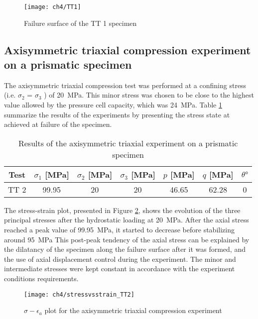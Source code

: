 \begin{figure}[tb]
    \centering
    \texttt{[image: ch4/TT1]}
    \caption{Failure surface of the TT 1 specimen}
    \label{fig4:12}
\end{figure} 

\subsection{Axisymmetric triaxial compression experiment on a prismatic specimen}

The axisymmetric triaxial compression test was performed at a confining stress (i.e. $\sigma_2$ = $\sigma_3$ ) of \SI{20}{MPa}. This minor stress was chosen to be close to the highest value allowed by the pressure cell capacity, which was \SI{24}{MPa}. Table \ref{tb4:TT2} summarize the results of the experiments by presenting the stress state at achieved at failure of the specimen. 

\begin{table}
    \centering
    \begin{tabular}{ccccccc}
        \hline
        Test & $\sigma_1$ [\si{MPa}] & $\sigma_2$ [\si{MPa}] & $\sigma_3$ [\si{MPa}] & $p$ [\si{MPa}] & $q$ [\si{MPa}] & $\theta \si{\degree}$ \\
        \hline
        \hline
        TT 2 & 99.95 & 20 & 20 & 46.65 & 62.28 & 0\\
        \hline
    \end{tabular}
    \caption{Results of the axisymmetric triaxial experiment on a prismatic specimen}
    \label{tb4:TT2}
\end{table}

The stress-strain plot, presented in Figure \ref{fig4:13}, shows the evolution of the three principal stresses after the hydrostatic loading at \SI{20}{MPa}. After the axial stress reached a peak value of \SI{99.95}{MPa}, it started to decrease before stabilizing around \SI{95}{MPa} This post-peak tendency of the axial stress can be explained by the dilatancy of the specimen along the failure surface after it was formed, and the use of axial displacement control during the experiment. The minor and intermediate stresses were kept constant in accordance with the experiment conditions requirements.

\begin{figure}[tb]
    \centering
    \texttt{[image: ch4/stressvsstrain\_TT2]}
    \caption{$\sigma - \epsilon_a$ plot for the axisymmetric triaxial compression experiment}
    \label{fig4:13}
\end{figure} 

